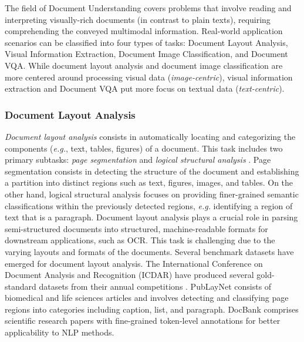 The field of Document Understanding covers problems that involve reading and interpreting visually-rich documents (in contrast to plain texts), requiring comprehending the conveyed multimodal information. Real-world application scenarios can be classified into four types of tasks: Document Layout Analysis, Visual Information Extraction, Document Image Classification, and \ac{Document VQA}. While document layout analysis and document image classification are more centered around processing visual data (\textit{image-centric}), visual information extraction and \ac{Document VQA} put more focus on textual data (\textit{text-centric}).

\subsubsection{Document Layout Analysis}

\textit{Document layout analysis} consists in automatically locating and categorizing the components (\textit{e.g.}, text, tables, figures) of a document. This task includes two primary subtasks: \textit{page segmentation} and \textit{logical structural analysis} \citep{binmakhashen2019document}. Page segmentation consists in detecting the structure of the document and establishing a partition into distinct regions such as text, figures, images, and tables. On the other hand, logical structural analysis focuses on providing finer-grained semantic classifications within the previously detected regions, \textit{e.g.} identifying a region of text that is a paragraph. Document layout analysis plays a crucial role in parsing semi-structured documents into structured, machine-readable formats for downstream applications, such as \ac{OCR}. This task is challenging due to the varying layouts and formats of the documents. Several benchmark datasets have emerged for document layout analysis. The International Conference on Document Analysis and Recognition (ICDAR) have produced several gold-standard datasets from their annual competitions \citep{antonacopoulos2013icdar, gao2017icdar2017}. PubLayNet \citep{zhong2019publaynet} consists of biomedical and life sciences articles and involves detecting and classifying page regions into categories including caption, list, and paragraph. 
DocBank \citep{li2020docbank} comprises scientific research papers with fine-grained token-level annotations for better applicability to \ac{NLP} methods.

